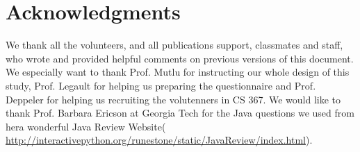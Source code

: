 \documentclass{sigchi}
\begin{document}
\section{Acknowledgments}

We thank all the volunteers, and all publications support, classmates  and staff, who wrote and provided helpful comments on previous versions of this document. 
We especially want to thank Prof. Mutlu for instructing our whole design of this study,  Prof. Legault for helping us preparing the questionnaire and Prof. Deppeler for helping us recruiting the volutenners in CS 367.
We would like to thank Prof. Barbara Ericson at Georgia Tech for the Java questions we used from hera wonderful Java Review Website( \url{http://interactivepython.org/runestone/static/JavaReview/index.html}).
\end{document}
